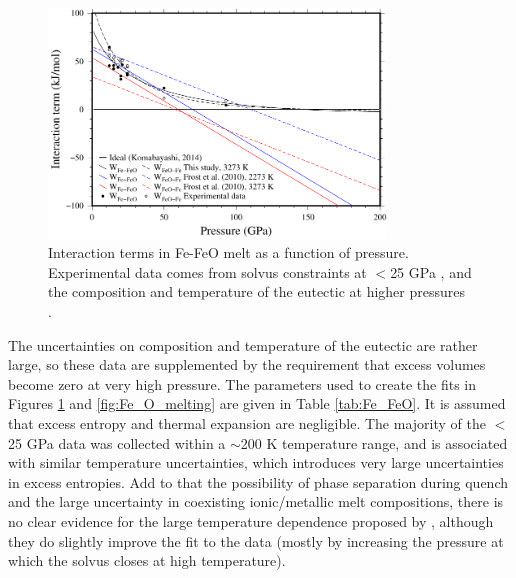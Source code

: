 \documentclass[review]{elsarticle}
\begin{document}
\begin{figure}[ht!]
  \centering
  \includegraphics[width=0.8\textwidth]{figures/Fe_FeO_interaction_terms}
  \caption{Interaction terms in Fe-FeO melt as a function of pressure. Experimental data comes from solvus constraints at $<$25 GPa \citep{TOT2007,Frostetal2010}, and the composition and temperature of the eutectic at higher pressures \citep{SHCPW2008}.}
  \label{fig:Fe_O_interaction}
\end{figure}

The uncertainties on composition and temperature of the eutectic are rather large, so these data are supplemented by the requirement that excess volumes become zero at very high pressure. The parameters used to create the fits in Figures \ref{fig:Fe_O_interaction} and \ref{fig:Fe_O_melting} are given in Table \ref{tab:Fe_FeO}. It is assumed that excess entropy and thermal expansion are negligible. The majority of the $<$25 GPa data was collected within a $\sim$200 K temperature range, and is associated with similar temperature uncertainties, which introduces very large uncertainties in excess entropies. Add to that the possibility of phase separation during quench and the large uncertainty in coexisting ionic/metallic melt compositions, there is no clear evidence for the large temperature dependence proposed by \cite{Frostetal2010}, although they do slightly improve the fit to the data (mostly by increasing the pressure at which the solvus closes at high temperature).
\end{document}
